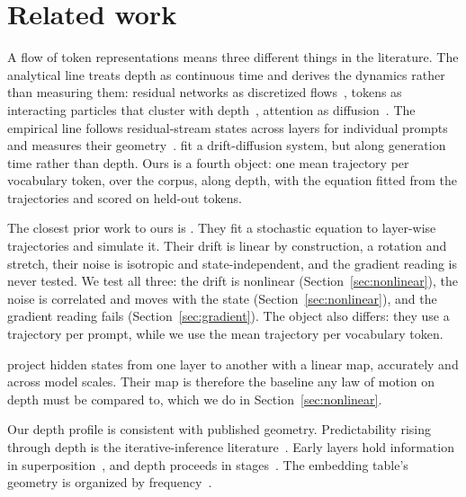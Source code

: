 \documentclass[mlmain]{jmlr}
\begin{document}
\section{Related work}

A flow of token representations means three different things in the
literature. The
analytical line treats depth as continuous time and derives the
dynamics rather than measuring them: residual networks as discretized
flows~\citep{chen2018neural}, tokens as interacting particles that
cluster with depth~\citep{geshkovski2025mathematical}, attention as
diffusion~\citep{sander2022sinkformers}. The empirical line follows
residual-stream states across layers for individual prompts and
measures their
geometry~\citep{fernando2025dynamics,fernando2026spectral,disipio2025curved}.
\citet{carson2025statistical} fit a drift-diffusion system, but along
generation time rather than depth. Ours is a fourth object: one mean
trajectory per vocabulary token, over the corpus, along depth, with
the equation fitted from the trajectories and scored on held-out
tokens.

The closest prior work to ours is \citet{sarfati2024lines}. They fit a
stochastic equation to layer-wise trajectories and simulate it. Their
drift is linear by construction, a rotation and stretch, their noise
is isotropic and state-independent, and the gradient reading is never
tested. We test all three: the drift is nonlinear
(Section~\ref{sec:nonlinear}), the noise is correlated and moves with
the state (Section~\ref{sec:nonlinear}), and the gradient reading
fails (Section~\ref{sec:gradient}). The object also differs: they use a trajectory
 per prompt, while we use the mean trajectory per vocabulary
token.


\citet{yomdin2024jump} project hidden states from one layer to another
with a linear map, accurately and across model scales. Their map is
therefore the baseline any law of motion on depth must be compared to, which we do in
Section~\ref{sec:nonlinear}.


Our depth profile is consistent with published geometry. Predictability
rising through depth is the iterative-inference
literature~\citep{jastrzebski2018residual,nostalgebraist2020logit,geva2022promotion,belrose2023tuned}.
Early layers hold information in
superposition~\citep{lombardo2026phases}, and depth proceeds in
stages~\citep{lad2024stages}. The embedding table's geometry is
organized by
frequency~\citep{mu2018allbut,gao2019degeneration,ethayarajh2019contextual,puccetti2022outlier}.
\end{document}
